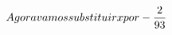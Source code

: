 \documentclass[preview]{standalone}
\begin{document}
\begin{align*}
\special{dvisvgm:raw <g id='unique000'>}Agora vamos substituir x por - \frac{2}{93}\special{dvisvgm:raw </g>}
\end{align*}
\end{document}
